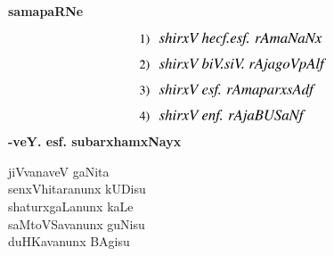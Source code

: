 

~
\medskip

\vfill

\thispagestyle{empty}

\begin{center}
{\Large\bfseries samapaRNe}
\end{center}
\bigskip

\begin{align*}
1) &~~~ \text{\large {\em shirxV hecf.esf. rAmaNaNx}}\\[0.2cm]
2) &~~~ \text{\large {\em shirxV biV.siV. rAjagoVpAlf}}\\[0.2cm]
3) &~~~ \text{\large {\em shirxV esf. rAmaparxsAdf}}\\[0.2cm]
4) &~~~ \text{\large {\em shirxV enf. rAjaBUSaNf}}
\end{align*}
\hfill{\bf -veY. esf. subarxhamxNayx}                                                 

\vfill
\begin{center}
jiVvanaveV gaNita\\
  senxVhitaranunx kUDisu\\
  shaturxgaLanunx kaLe\\
  saMtoVSavanunx guNisu\\
  duHKavanunx BAgisu
\end{center}
\vfill
\eject



